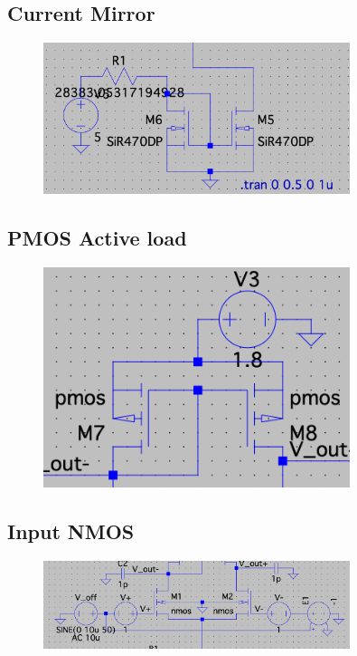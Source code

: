 \documentclass[12pt,a4paper]{article}
\begin{document}
\subsection{Current Mirror}
\begin{figure}[ht!]
	\centering
	\includegraphics[width=0.8\textwidth]{Simluations/Experiment_4/figs/current_mirror.png}
\end{figure}
\pagebreak
\subsection{PMOS Active load}
\begin{figure}[ht!]
	\centering
	\includegraphics[width=0.8\textwidth]{Simluations/Experiment_4/figs/active_load.png}
\end{figure}
\subsection{Input NMOS}
\begin{figure}[ht!]
	\centering
	\includegraphics[width=0.8\textwidth]{Simluations/Experiment_4/figs/input_nmos.png}
\end{figure}
\end{document}
